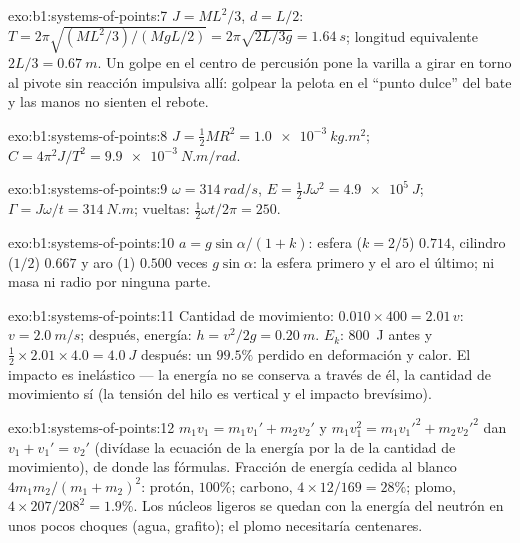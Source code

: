 \begin{solution}{exo:b1:systems-of-points:7}
$J = ML^2/3$, $d = L/2$: $T = 2\pi\sqrt{(ML^2/3)/(MgL/2)} = 2\pi\sqrt{2L/3g}
= \qty{1.64}{s}$; longitud equivalente $2L/3 = \qty{0.67}{m}$. Un golpe en
el centro de percusión pone la varilla a girar en torno al pivote sin
reacción impulsiva allí: golpear la pelota en el ``punto dulce'' del bate
y las manos no sienten el rebote.
\end{solution}

\begin{solution}{exo:b1:systems-of-points:8}
$J = \tfrac12 MR^2 = \qty{1.0e-3}{kg.m^2}$; $C = 4\pi^2J/T^2 = \qty{9.9e-3}{N.m/rad}$.
\end{solution}

\begin{solution}{exo:b1:systems-of-points:9}
$\omega = \qty{314}{rad/s}$, $E = \tfrac12 J\omega^2 = \qty{4.9e5}{J}$;
$\Gamma = J\omega/t = \qty{314}{N.m}$; vueltas: $\tfrac12\omega t/2\pi = 250$.
\end{solution}

\begin{solution}{exo:b1:systems-of-points:10}
$a = g\sin\alpha/(1 + k)$: esfera ($k = 2/5$) $0.714$, cilindro ($1/2$)
$0.667$ y aro ($1$) $0.500$ veces $g\sin\alpha$: la esfera primero y el aro
el último; ni masa ni radio por ninguna parte.
\end{solution}

\begin{solution}{exo:b1:systems-of-points:11}
Cantidad de movimiento: $0.010 \times 400 = 2.01\,v$: $v = \qty{2.0}{m/s}$;
después, energía: $h = v^2/2g = \qty{0.20}{m}$. $E_k$: \qty{800}{J} antes y
$\tfrac12 \times
2.01 \times 4.0 = \qty{4.0}{J}$ después: un $99.5\%$ perdido en deformación
y calor. El impacto es inelástico --- la energía no se conserva a través
de él, la cantidad de movimiento sí (la tensión del hilo es vertical y el
impacto brevísimo).
\end{solution}

\begin{solution}{exo:b1:systems-of-points:12}
$m_1v_1 = m_1v_1' + m_2v_2'$ y $m_1v_1^2 = m_1v_1'^2 + m_2v_2'^2$ dan
$v_1 + v_1' = v_2'$ (divídase la ecuación de la energía por la de la
cantidad de movimiento), de donde las fórmulas. Fracción de energía cedida
al blanco $4m_1m_2/(m_1 + m_2)^2$: protón, $100\%$; carbono,
$4 \times 12/169 = 28\%$; plomo, $4 \times 207/208^2 =
1.9\%$. Los núcleos ligeros se quedan con la energía del neutrón en unos
pocos choques (agua, grafito); el plomo necesitaría centenares.
\end{solution}

